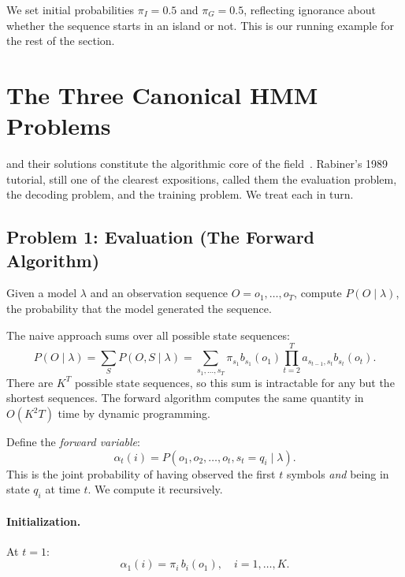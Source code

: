 We set initial probabilities $\pi_I = 0.5$ and $\pi_G = 0.5$, reflecting ignorance about whether the sequence starts in an island or not.
This is our running example for the rest of the section.


\section{The Three Canonical HMM Problems}
\label{sec:hmm-problems}

 and their solutions constitute the algorithmic core of the field~\cite{rabiner1989}.
Rabiner's 1989 tutorial, still one of the clearest expositions, called them the evaluation problem, the decoding problem, and the training problem.
We treat each in turn.

\subsection{Problem 1: Evaluation (The Forward Algorithm)}
\label{sec:forward}

Given a model $\lambda$ and an observation sequence $O = o_1, \ldots, o_T$, compute $P(O \mid \lambda)$, the probability that the model generated the sequence.

The naive approach sums over all possible state sequences:
\begin{equation}
\label{eq:naive-eval}
  P(O \mid \lambda) = \sum_{S} P(O, S \mid \lambda) = \sum_{s_1, \ldots, s_T} \pi_{s_1} b_{s_1}(o_1) \prod_{t=2}^{T} a_{s_{t-1}, s_t} b_{s_t}(o_t).
\end{equation}
There are $K^T$ possible state sequences, so this sum is intractable for any but the shortest sequences.
The forward algorithm computes the same quantity in $O(K^2 T)$ time by dynamic programming.

Define the \textit{forward variable}:
\begin{equation}
\label{eq:forward-def}
  \alpha_t(i) = P(o_1, o_2, \ldots, o_t, s_t = q_i \mid \lambda).
\end{equation}
This is the joint probability of having observed the first $t$ symbols \textit{and} being in state $q_i$ at time $t$.
We compute it recursively.

\paragraph{Initialization.}
At $t = 1$:
\begin{equation}
\label{eq:forward-init}
  \alpha_1(i) = \pi_i \, b_i(o_1), \quad i = 1, \ldots, K.
\end{equation}

